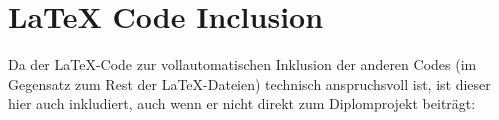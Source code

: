 \section{LaTeX Code Inclusion}
Da der LaTeX-Code zur vollautomatischen Inklusion der anderen Codes (im Gegensatz zum Rest der LaTeX-Dateien)
technisch anspruchsvoll ist,
ist dieser hier auch inkludiert,
auch wenn er nicht direkt zum Diplomprojekt beiträgt:

